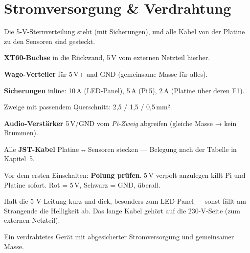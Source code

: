\clearpage
\section{Stromversorgung \& Verdrahtung}
\begin{ziel}
Die 5-V-Sternverteilung steht (mit Sicherungen), und alle Kabel von der Platine zu den
Sensoren sind gesteckt.
\end{ziel}
\begin{schritte}
  \item \textbf{XT60-Buchse} in die Rückwand, 5\,V vom externen Netzteil hierher.
  \item \textbf{Wago-Verteiler} für 5\,V+ und GND (gemeinsame Masse für alles).
  \item \textbf{Sicherungen} inline: 10\,A (LED-Panel), 5\,A (Pi\,5), 2\,A (Platine über deren F1).
  \item Zweige mit passendem Querschnitt: 2,5 / 1,5 / 0,5\,mm².
  \item \textbf{Audio-Verstärker} 5\,V/GND vom \emph{Pi-Zweig} abgreifen (gleiche Masse → kein Brummen).
  \item Alle \textbf{JST-Kabel} Platine\,↔\,Sensoren stecken — Belegung nach der Tabelle in Kapitel~5.
\end{schritte}
\begin{achtung}
Vor dem ersten Einschalten: \textbf{Polung prüfen}. 5\,V verpolt anzulegen killt Pi und
Platine sofort. Rot = 5\,V, Schwarz = GND, überall.
\end{achtung}
\begin{tipp}
Halt die 5-V-Leitung kurz und dick, besonders zum LED-Panel — sonst fällt am Strangende die
Helligkeit ab. Das lange Kabel gehört auf die 230-V-Seite (zum externen Netzteil).
\end{tipp}
\begin{ergebnis}
Ein verdrahtetes Gerät mit abgesicherter Stromversorgung und gemeinsamer Masse.
\end{ergebnis}

\clearpage
